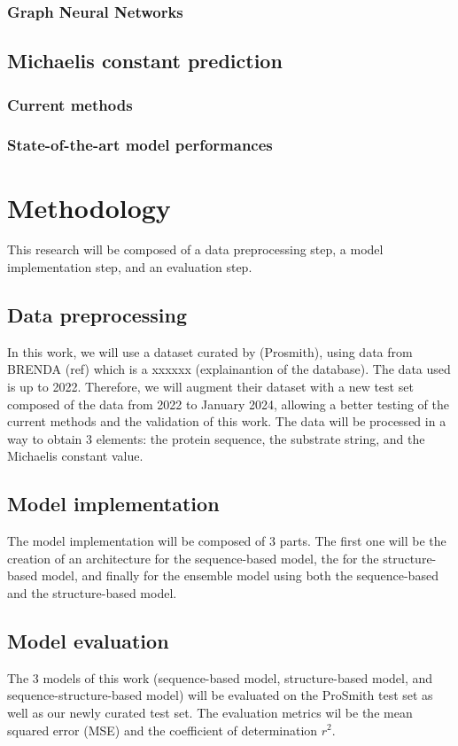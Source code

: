 \subsubsection{Graph Neural Networks}

\subsection{Michaelis constant prediction}
\subsubsection{Current methods}
\subsubsection{State-of-the-art model performances}

\section{Methodology}
This research will be composed of a data preprocessing step, a model implementation step, and an
evaluation step.
\subsection{Data preprocessing}
In this work, we will use a dataset curated by (Prosmith), using data from BRENDA (ref) which is a
xxxxxx (explainantion of the database).
The data used is up to 2022. Therefore, we will augment their dataset with a new test set composed of
the data from 2022 to January 2024, allowing a better testing of the current methods and the validation
of this work.
The data will be processed in a way to obtain 3 elements: the protein sequence, the substrate string,
and the Michaelis constant value.
\subsection{Model implementation}
The model implementation will be composed of 3 parts. The first one will be the creation of an architecture
for the sequence-based model, the for the structure-based model, and finally for the ensemble model using both
the sequence-based and the structure-based model.
\subsection{Model evaluation}
The 3 models of this work (sequence-based model, structure-based model, and sequence-structure-based model)
will be evaluated on the ProSmith test set as well as our newly curated test set. The evaluation metrics 
wil be the mean squared error (MSE) and the coefficient of determination $r^2$.

